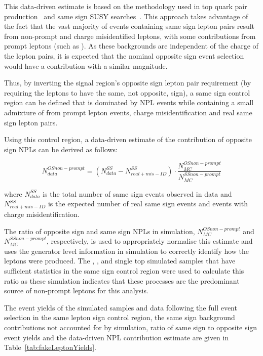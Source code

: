 This data-driven estimate is based on the methodology used in top quark pair production~\cite{CMS:2016syx} and same sign SUSY searches~\cite{CMS:2015vqc}.
This approach takes advantage of the fact that the vast majority of events containing same sign lepton pairs result from non-prompt and charge misidentified leptons, with some contributions from prompt leptons (such as \ttV).
As these backgrounds are independent of the charge of the lepton pairs, it is expected that the nominal opposite sign event selection would have a contribution with a similar magnitude.

Thus, by inverting the signal region's opposite sign lepton pair requirement (\ie by requiring the leptons to have the same, not opposite, sign), a same sign control region can be defined that is dominated by NPL events while containing a small admixture of from prompt lepton events, charge misidentification and real same sign lepton pairs.

Using this control region, a data-driven estimate of the contribution of opposite sign NPLs can be derived as follows:

\begin{equation}\label{eq:NPL}
N_{data}^{OS non-prompt} = (N_{data}^{SS} - N^{SS}_{real + mis-ID}) \cdot \frac{N_{MC}^{OS non-prompt}}{N_{MC}^{SS non-prompt}}
\end{equation}

where $N_{data}^{SS}$ is the total number of same sign events observed in data and $N^{SS}_{real + mis-ID}$ is the expected number of real same sign events and events with charge misidentification.

The ratio of opposite sign and same sign NPLs in simulation, $N_{MC}^{OS non-prompt}$ and $N_{MC}^{SS non-prompt}$, respectively, is used to appropriately normalise this estimate and uses the generator level information in simulation to correctly identify how the leptons were produced.
The \ttZ, \ttW, and single top simulated samples that have sufficient statistics in the same sign control region were used to calculate this ratio as these simulation indicates that these processes are the predominant source of non-prompt leptons for this analysis.

The event yields of the simulated samples and data following the full event selection in the same lepton sign control region, the same sign background contributions not accounted for by simulation, ratio of same sign to opposite sign event yields and the data-driven NPL contribution estimate are given in Table~\ref{tab:fakeLeptonYields}.

